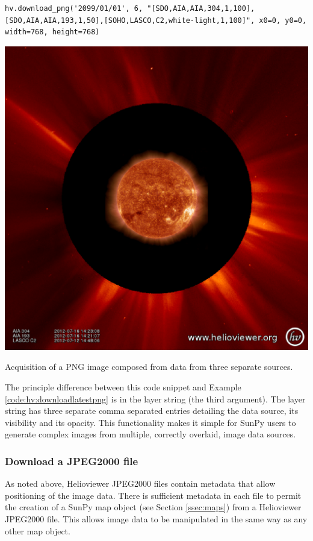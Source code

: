 \begin{listing}
\begin{verbatim}
hv.download_png('2099/01/01', 6, "[SDO,AIA,AIA,304,1,100],[SDO,AIA,AIA,193,1,50],[SOHO,LASCO,C2,white-light,1,100]", x0=0, y0=0, width=768, height=768)
\end{verbatim}
\includegraphics[width=0.8\columnwidth]{helioviewer_overlay_example.eps}
\caption{Acquisition of a PNG image composed from data from three
  separate sources.}
\label{code:hv:overlaid}
\end{listing}

The principle difference between this code snippet and Example
\ref{code:hv:downloadlatestpng} is in the layer string (the third
argument).  The layer string has three separate comma separated
entries detailing the data source, its visibility and its opacity.
This functionality makes it simple for SunPy users to generate complex
images from multiple, correctly overlaid, image data sources.


\subsubsection{Download a JPEG2000 file}\label{sssec:hv:jp}

As noted above, Helioviewer JPEG2000 files contain metadata that allow
positioning of the image data.  There is sufficient metadata in each
file to permit the creation of a SunPy map object (see Section
\ref{ssec:maps}) from a Helioviewer JPEG2000 file.  This allows image
data to be manipulated in the same way as any other map object.

